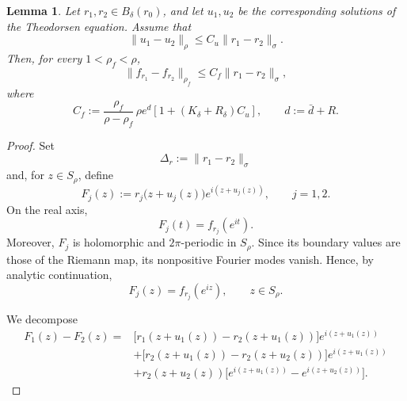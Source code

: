 \documentclass[10pt,a4paper]{amsart}
\newtheorem{lemma}{Lemma}
\begin{document}
\begin{lemma}\label{lem:Cf}
	Let $r_1,r_2\in B_\delta(r_0)$, and let $u_1,u_2$ be the
	corresponding solutions of the Theodorsen equation. Assume that
	\[
	\|u_1-u_2\|_\rho
	\le
	C_u\|r_1-r_2\|_\sigma .
	\]
	Then, for every $1<\rho_f<\rho$,
	\begin{equation}\label{eq:f-lipschitz}
		\|f_{r_1}-f_{r_2}\|_{\rho_f}
		\le
		C_f\|r_1-r_2\|_\sigma ,
	\end{equation}
	where
	\begin{equation}\label{eq:Cf}
		C_f
		:=
		\frac{\rho_f}{\rho-\rho_f}\,
		\rho e^d
		\left[
		1+(K_\delta+R_\delta)C_u
		\right],
		\qquad
		d:=\bar d+R .
	\end{equation}
\end{lemma}

\begin{proof}
	Set
	\[
	\Delta_r:=\|r_1-r_2\|_\sigma
	\]
	and, for $z\in S_\rho$, define
	\[
	F_j(z)
	:=
	r_j\bigl(z+u_j(z)\bigr)
	e^{i(z+u_j(z))},
	\qquad j=1,2.
	\]
	On the real axis,
	\[
	F_j(t)=f_{r_j}(e^{it}).
	\]
	Moreover, $F_j$ is holomorphic and $2\pi$-periodic in $S_\rho$.
	Since its boundary values are those of the Riemann map, its
	nonpositive Fourier modes vanish. Hence, by analytic continuation,
	\begin{equation}\label{eq:F-f-identification}
		F_j(z)=f_{r_j}(e^{iz}),
		\qquad z\in S_\rho.
	\end{equation}
	
	We decompose
	\[
	\begin{aligned}
		F_1(z)-F_2(z)
		={}&
		\bigl[
		r_1(z+u_1(z))-r_2(z+u_1(z))
		\bigr]e^{i(z+u_1(z))}
		\\
		&+
		\bigl[
		r_2(z+u_1(z))-r_2(z+u_2(z))
		\bigr]e^{i(z+u_1(z))}
		\\
		&+
		r_2(z+u_2(z))
		\bigl[
		e^{i(z+u_1(z))}-e^{i(z+u_2(z))}
		\bigr].
	\end{aligned}
	\]
	

\end{proof}
\end{document}
